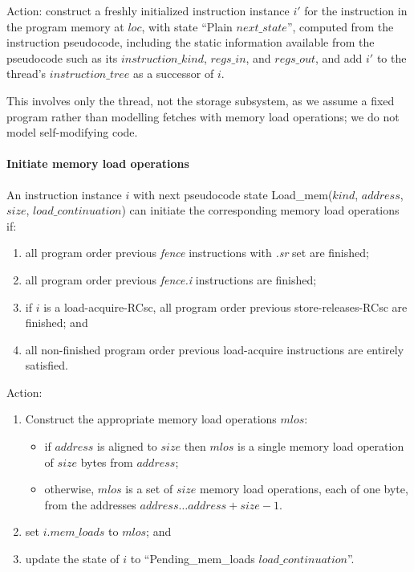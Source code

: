Action: construct a freshly initialized instruction instance $i'$ for the instruction in the program memory at $loc$, with state ``{\sc Plain} $next\_state$'', computed from the instruction pseudocode, including the static information available from the pseudocode such as its $instruction\_kind$, $regs\_in$, and $regs\_out$, and add $i'$ to the thread's $instruction\_tree$ as a successor of $i$.

\begin{commentary}
This involves only the thread, not the storage subsystem, as we assume a fixed program rather than modelling fetches with memory load operations; we do not model self-modifying code.
\end{commentary}


\paragraph{Initiate memory load operations}\label{omm:thread:initiate_mem_read}
An instruction instance $i$ with next pseudocode state {\sc Load\_mem}($kind$, $address$, $size$, $load\_continuation$) can initiate the corresponding memory load operations if:
\begin{enumerate}
\item all program order previous {\em fence} instructions with {\em .sr} set are finished;
\item all program order previous {\em fence.i} instructions are finished; 
\item if $i$ is a load-acquire-RCsc, all program order previous store-releases-RCsc are finished; and
\item all non-finished program order previous load-acquire instructions are entirely satisfied.
\end{enumerate}
Action:
\begin{enumerate}
\item Construct the appropriate memory load operations $mlos$:
  \begin{itemize}
  \item if $address$ is aligned to $size$ then $mlos$ is a single memory load operation of $size$ bytes from $address$;
  \item otherwise, $mlos$ is a set of $size$ memory load operations, each of one byte, from the addresses $address\ldots address+size-1$.
  \end{itemize}
\item set $i.mem\_loads$ to $mlos$; and
\item update the state of $i$ to ``{\sc Pending\_mem\_loads} $load\_continuation$''.
\end{enumerate}


